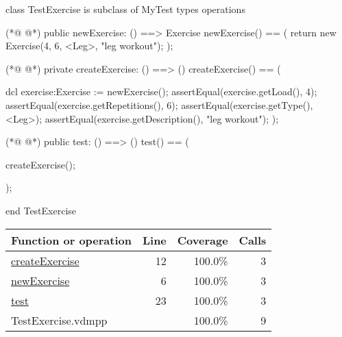 \begin{vdmpp}[breaklines=true]
class TestExercise is subclass of MyTest
types
operations
 
 
(*@
\label{newExercise:6}
@*)
  public newExercise: () ==> Exercise
 newExercise() == (
  return new Exercise(4, 6, <Leg>, "leg workout");
 );
 
 
(*@
\label{createExercise:12}
@*)
 private createExercise: () ==> ()
 createExercise() == (
    
    dcl exercise:Exercise  := newExercise();
    assertEqual(exercise.getLoad(), 4);
    assertEqual(exercise.getRepetitions(), 6);
    assertEqual(exercise.getType(), <Leg>);
    assertEqual(exercise.getDescription(), "leg workout");
 );
 
 
(*@
\label{test:23}
@*)
 public test: () ==> ()
 test() == (
  
   createExercise();
 
 );

 
end TestExercise
\end{vdmpp}
\bigskip
\begin{longtable}{|l|r|r|r|}
\hline
Function or operation & Line & Coverage & Calls \\
\hline
\hline
\hyperref[createExercise:12]{createExercise} & 12&100.0\% & 3 \\
\hline
\hyperref[newExercise:6]{newExercise} & 6&100.0\% & 3 \\
\hline
\hyperref[test:23]{test} & 23&100.0\% & 3 \\
\hline
\hline
TestExercise.vdmpp & & 100.0\% & 9 \\
\hline
\end{longtable}

